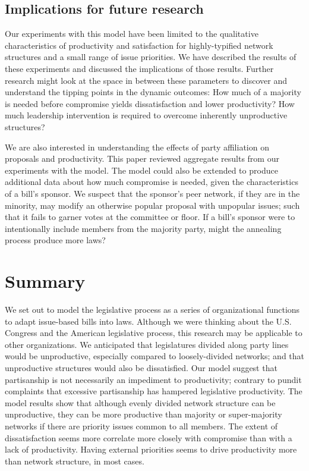 \documentclass[pdftex,12pt]{llncs}
\begin{document}
\subsection{Implications for future research}
Our experiments with this model have been limited to the qualitative characteristics of productivity and satisfaction for highly-typified network structures and a small range of issue priorities.
We have described the results of these experiments and discussed the implications of those results.
Further research might look at the space in between these parameters to discover and understand the tipping points in the dynamic outcomes:
How much of a majority is needed before compromise yields dissatisfaction and lower productivity? 
How much leadership intervention is required to overcome inherently unproductive structures?

We are also interested in understanding the effects of party affiliation on proposals and productivity. This paper reviewed aggregate results from our experiments with the model.
The model could also be extended to produce additional data about how much compromise is needed, given the characteristics of a bill's sponsor.
We suspect that the sponsor's peer network, if they are in the minority, may modify an otherwise popular proposal with unpopular issues; such that it fails to garner votes at the committee or floor. 
If a bill's sponsor were to intentionally include members from the majority party, might the annealing process produce more laws?

\section{Summary}
We set out to model the legislative process as a series of organizational functions to adapt issue-based bills into laws.
Although we were thinking about the U.S. Congress and the American legislative process, this research may be applicable to other organizations.
We anticipated that legislatures divided along party lines would be unproductive, especially compared to loosely-divided networks; and that unproductive structures would also be dissatisfied.
Our model suggest that partisanship is not necessarily an impediment to productivity; contrary to pundit complaints that excessive partisanship has hampered legislative productivity.
The model results show that although evenly divided network structure can be unproductive, they can be more productive than majority or super-majority networks if there are priority issues common to all members.
The extent of dissatisfaction seems more correlate more closely with compromise than with a lack of productivity. 
Having external priorities seems to drive productivity more than network structure, in most cases. 
\end{document}
